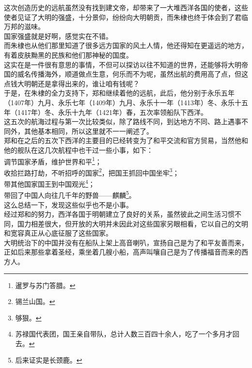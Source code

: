 \begin{multicols}{\theparacolNo}
这次创造历史的远航虽然没有找到建文帝，却带来了一大堆西洋各国的使者，这些使者见证了大明的强盛，十分景仰，纷纷向大明朝贡，而朱棣也终于体会到了君临万邦的滋味。\\

国家强盛就是好啊，感觉实在不错。\\

而朱棣也从他们那里知道了很多远方国家的风土人情，他还得知在更遥远的地方，有着皮肤黝黑的民族和他们那神秘的国度。\\

这实在是一件很有意思的事情，不但可以探访以往不知道的世界，还能够将大明帝国的威名传播海外，顺道做点生意，何乐而不为呢，虽然出航的费用高了点，但这点钱大明朝还是拿得出来的，谁让咱有钱呢？\\

于是，在朱棣的全力支持下，郑和继续着他的远航，此后，他分别于永乐五年（1407年）九月、永乐七年（1409年）九月、永乐十一年（1413年）冬、永乐十五年（1417年）冬、永乐十九年（1421年）春，五次率领船队下西洋。\\

这五次的航海过程与第一次比较类似，除了路线不同，到达地方不同、路上遇事不同外，其他基本相同，所以这里就不一一阐述了。\\

郑和在之后的五次下西洋的主要目的已经转变为了和平交流和官方贸易，当然他和他的舰队在这几次航程中也干过一些小事，如下：\\

调节国家矛盾，维护世界和平\footnote{暹罗与苏门答腊。}；\\

收拾拦路打劫，不听招呼的国家\footnote{锡兰山国。}，把国王抓回中国坐牢\footnote{够狠。}；\\

带其他国家国王到中国观光\footnote{苏禄国代表团，国王亲自带队，总计人数三百四十余人，吃了一个多月才回去。}；\\

带回了中国人向往几千年的野兽——麒麟\footnote{后来证实是长颈鹿。}。\\

这么总结一下，发现这些似乎也不是小事。\\

经过郑和的努力，西洋各国于明朝建立了良好的关系，虽然彼此之间生活习惯不同，国力相差很大，但开放的大明并未因此对这些国家另眼相看，它以自己的文明和宽容真正从心底征服了这些国家。\\

大明统治下的中国并没有在船队上架上高音喇叭，宣扬自己是为了和平友善而来，正如后来那些拿着圣经，乘坐着几艘小船，高声叫嚷自己是为了传播福音而来的西方人。\\


\end{multicols}
